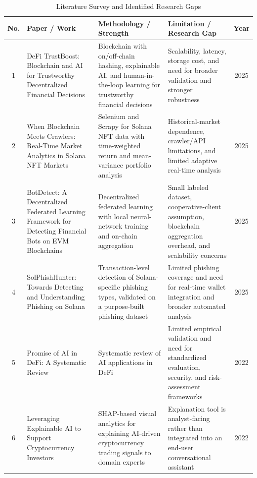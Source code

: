 \documentclass[conference]{IEEEtran}
\begin{document}
\begin{table}[t]
\caption{Literature Survey and Identified Research Gaps}
\label{tab:literature}
\centering
\small
\begin{tabularx}{\textwidth}{c X X X c}
\toprule
\textbf{No.} & \textbf{Paper / Work} & \textbf{Methodology / Strength} & \textbf{Limitation / Research Gap} & \textbf{Year}\\
\midrule

1 & DeFi TrustBoost: Blockchain and AI for Trustworthy Decentralized Financial Decisions &
Blockchain with on/off-chain hashing, explainable AI, and human-in-the-loop learning for trustworthy financial decisions &
Scalability, latency, storage cost, and need for broader validation and stronger robustness &
2025\\

2 & When Blockchain Meets Crawlers: Real-Time Market Analytics in Solana NFT Markets &
Selenium and Scrapy for Solana NFT data with time-weighted return and mean-variance portfolio analysis &
Historical-market dependence, crawler/API limitations, and limited adaptive real-time analysis &
2025\\

3 & BotDetect: A Decentralized Federated Learning Framework for Detecting Financial Bots on EVM Blockchains &
Decentralized federated learning with local neural-network training and on-chain aggregation &
Small labeled dataset, cooperative-client assumption, blockchain aggregation overhead, and scalability concerns &
2025\\

4 & SolPhishHunter: Towards Detecting and Understanding Phishing on Solana &
Transaction-level detection of Solana-specific phishing types, validated on a purpose-built phishing dataset &
Limited phishing coverage and need for real-time wallet integration and broader automated analysis &
2025\\

5 & Promise of AI in DeFi: A Systematic Review &
Systematic review of AI applications in DeFi &
Limited empirical validation and need for standardized evaluation, security, and risk-assessment frameworks &
2022\\

6 & Leveraging Explainable AI to Support Cryptocurrency Investors &
SHAP-based visual analytics for explaining AI-driven cryptocurrency trading signals to domain experts &
Explanation tool is analyst-facing rather than integrated into an end-user conversational assistant &
2022\\


\end{tabularx}
\end{table}
\end{document}
